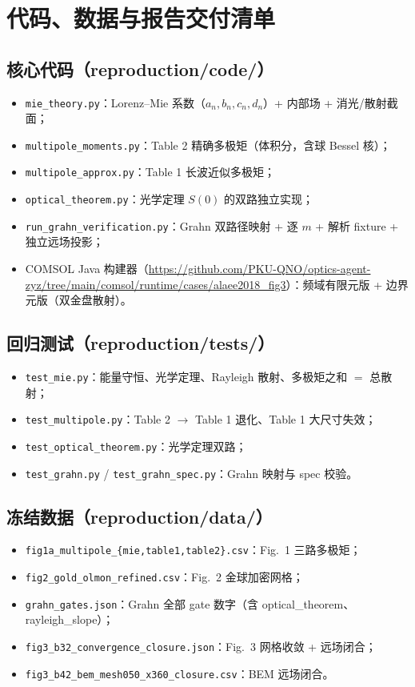 \section{代码、数据与报告交付清单}

\subsection{核心代码（reproduction/code/）}

\begin{itemize}
  \item \texttt{mie\_theory.py}：Lorenz--Mie 系数（$a_n,b_n,c_n,d_n$）+ 内部场 + 消光/散射截面；
  \item \texttt{multipole\_moments.py}：Table 2 精确多极矩（体积分，含球 Bessel 核）；
  \item \texttt{multipole\_approx.py}：Table 1 长波近似多极矩；
  \item \texttt{optical\_theorem.py}：光学定理 $S(0)$ 的双路独立实现；
  \item \texttt{run\_grahn\_verification.py}：Grahn 双路径映射 + 逐 $m$ + 解析 fixture + 独立远场投影；
  \item COMSOL Java 构建器（\url{https://github.com/PKU-QNO/optics-agent-zyz/tree/main/comsol/runtime/cases/alaee2018_fig3}）：频域有限元版 + 边界元版（双金盘散射）。
\end{itemize}

\subsection{回归测试（reproduction/tests/）}

\begin{itemize}
  \item \texttt{test\_mie.py}：能量守恒、光学定理、Rayleigh 散射、多极矩之和 $=$ 总散射；
  \item \texttt{test\_multipole.py}：Table 2 $\to$ Table 1 退化、Table 1 大尺寸失效；
  \item \texttt{test\_optical\_theorem.py}：光学定理双路；
  \item \texttt{test\_grahn.py} / \texttt{test\_grahn\_spec.py}：Grahn 映射与 spec 校验。
\end{itemize}

\subsection{冻结数据（reproduction/data/）}

\begin{itemize}
  \item \texttt{fig1a\_multipole\_\{mie,table1,table2\}.csv}：Fig.~1 三路多极矩；
  \item \texttt{fig2\_gold\_olmon\_refined.csv}：Fig.~2 金球加密网格；
  \item \texttt{grahn\_gates.json}：Grahn 全部 gate 数字（含 optical\_theorem、rayleigh\_slope）；
  \item \texttt{fig3\_b32\_convergence\_closure.json}：Fig.~3 网格收敛 + 远场闭合；
  \item \texttt{fig3\_b42\_bem\_mesh050\_x360\_closure.csv}：BEM 远场闭合。
\end{itemize}

